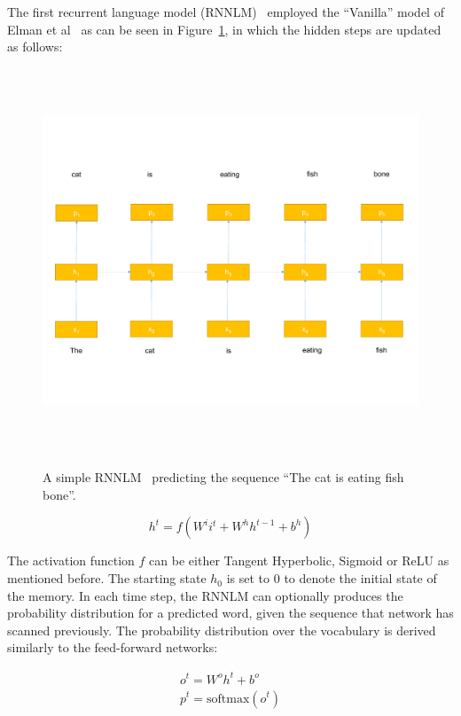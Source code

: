 The first recurrent language model (RNNLM)~\cite{mikolov2010recurrent} employed the ``Vanilla'' model of Elman et al~\cite{elman1990finding} as can be seen in Figure~\ref{fig:SimpleRNN}, in which the hidden steps are updated as follows:

~ \begin{figure}[!t]
	~ \centering
	~ \includegraphics[width=\columnwidth]{figures/rnn.pdf}
	~ \caption{A simple RNNLM~\cite{mikolov2010recurrent} predicting the sequence ``The cat is eating fish bone''.}  
	~ \label{fig:SimpleRNN}
	~ \end{figure}


\begin{equation}
h^t = f(W^i i^t +  W^h h^{t-1} + b^h)
\label{eq:rnnhidden}
\end{equation}

The activation function $f$ can be either Tangent Hyperbolic, Sigmoid or ReLU as mentioned before. The starting state $h_0$ is set to 0 to denote the initial state of the memory. In each time step, the RNNLM can optionally produces the probability distribution for a predicted word, given the sequence that network has scanned previously. The probability distribution over the vocabulary is derived similarly to the feed-forward networks:

\begin{equation}
\begin{aligned}
o^t = W^oh^t + b^o \\
p^t = \text{softmax}(o^t)
\end{aligned}
\label{eq:rnnoutput}
\end{equation}

